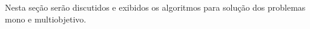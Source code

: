Nesta seção serão discutidos e exibidos os algoritmos para solução dos problemas mono e multiobjetivo.